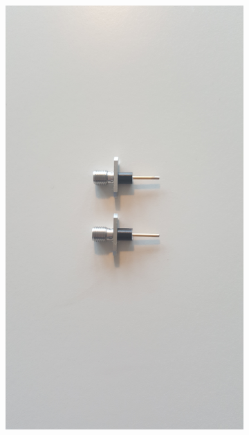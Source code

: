 \documentclass[main.tex]{subfiles}
\begin{document}
\begin{figure}[h]
        \begin{subfigure}{0.25\textwidth}
        \centering
        \includegraphics[angle=-90,trim=1450 100 1550 100,clip,width=0.97\linewidth]{figure/Filterbilder/u_sma_skalning.jpg} 
        \caption{}
        \label{fig:u_SMA_skalning}
    \end{subfigure}
        \begin{subfigure}{0.25\textwidth}
        \centering

\end{subfigure}
\end{figure}
\end{document}
